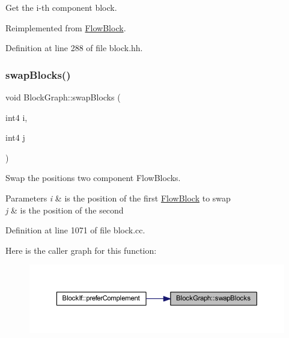 Get the i-\/th component block. 



Reimplemented from \mbox{\hyperlink{class_flow_block_a42070515fd8db6cc23916b359e259f4e}{Flow\+Block}}.



Definition at line 288 of file block.\+hh.

\mbox{\label{class_block_graph_ab7f8b2b90699d158b7b617012598f61c}} 
\subsubsection{\texorpdfstring{swapBlocks()}{swapBlocks()}}
{\footnotesize\ttfamily void Block\+Graph\+::swap\+Blocks (\begin{DoxyParamCaption}\item[{int4}]{i,  }\item[{int4}]{j }\end{DoxyParamCaption})\hspace{0.3cm}{\ttfamily [protected]}}



Swap the positions two component Flow\+Blocks. 


\begin{DoxyParams}{Parameters}
{\em i} & is the position of the first \mbox{\hyperlink{class_flow_block}{Flow\+Block}} to swap \\
\hline
{\em j} & is the position of the second \\
\hline
\end{DoxyParams}


Definition at line 1071 of file block.\+cc.

Here is the caller graph for this function\+:
\nopagebreak
\begin{figure}[H]
\begin{center}
\leavevmode
\includegraphics[width=350pt]{class_block_graph_ab7f8b2b90699d158b7b617012598f61c_icgraph}
\end{center}
\end{figure}
\mbox{\label{class_block_graph_a238a3ecac594008e2893b2fa1f85d95b}} 
